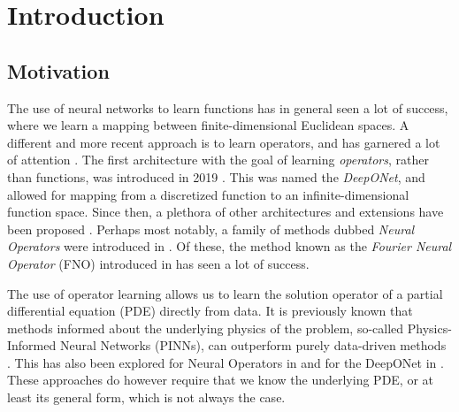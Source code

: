 \chapter{Introduction}

\section{Motivation}

The use of neural networks to learn functions has in general seen a lot of success, where we learn a mapping between 
finite-dimensional Euclidean spaces. A different and more recent approach is to learn operators, and has garnered a lot of attention . 
The first architecture with the goal of learning \textit{operators}, rather than functions, was introduced in 2019 .
This was named the \textit{DeepONet}, and allowed for mapping from a discretized function to an infinite-dimensional function space.
Since then, a plethora of other architectures and extensions have been proposed \cite{caoLNOLaplaceNeural2023,seidmanNOMADNonlinearManifold2022,xiongKoopmanNeuralOperator2024,wangImprovedArchitecturesTraining2022a,lanthalerOperatorLearningPCANet2023,prasthoferVariableInputDeepOperator2022}. 
Perhaps most notably, a family of methods dubbed \textit{Neural Operators} were introduced in \cite{kovachkiNeuralOperatorLearning2024}. Of these, the 
method known as the \textit{Fourier Neural Operator} (FNO) introduced in  has seen a lot of success.

The use of operator learning allows us to learn the solution operator of a partial differential equation (PDE) directly 
from data. It is previously known that methods informed about the underlying physics of the problem, so-called Physics-Informed Neural Networks (PINNs), can outperform purely data-driven methods .
This has also been explored for Neural Operators in  and for the DeepONet in .
These approaches do however require that we know the underlying PDE, or at least its general form, which is not always the case.

